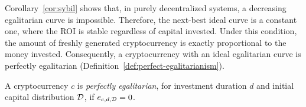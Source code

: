 Corollary~\ref{cor:sybil} shows that, in purely decentralized systems, a
decreasing egalitarian curve is impossible. Therefore, the next-best ideal
curve is a constant one, where the ROI is stable regardless of capital
invested. Under this condition, the amount of freshly generated cryptocurrency
is exactly proportional to the money invested. Consequently, a cryptocurrency
with an ideal egalitarian curve is perfectly egalitarian
(Definition~\ref{def:perfect-egalitarianism}).

\begin{definition}\label{def:perfect-egalitarianism}
    A cryptocurrency $c$ is \emph{perfectly egalitarian}, for investment
    duration $d$ and initial capital distribution $\mathcal{D}$, if $e_{c, d, \mathcal{D}}
    = 0$.
\end{definition}
